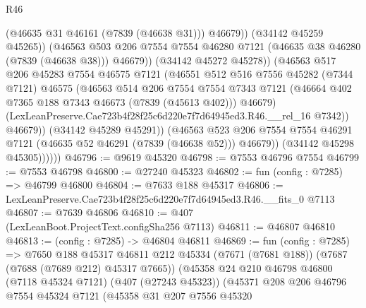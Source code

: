 \begin{lexlean}{R46}
\begin{coremodule}
                              (@46635 @31 @46161 (@7839 (@46638 @31)))
                              @46679))
                          (@34142 @45259 @45265))
                        (@46563
                          @503
                          @206
                          @7554
                          @7554
                          @46280
                          @7121
                          (@46635 @38 @46280 (@7839 (@46638 @38)))
                          @46679))
                      (@34142 @45272 @45278))
                    (@46563
                      @517
                      @206
                      @45283
                      @7554
                      @46575
                      @7121
                      (@46551
                        @512
                        @516
                        @7556
                        @45282
                        (@7344 @7121)
                        @46575
                        (@46563
                          @514
                          @206
                          @7554
                          @7554
                          @7343
                          @7121
                          (@46664 @402 @7365 @188 @7343 @46673 (@7839 (@45613 @402)))
                          @46679)
                        (LexLeanPreserve.Cae723b4f28f25c6d220e7f7d64945ed3.R46.__rel_16 @7342))
                      @46679))
                  (@34142 @45289 @45291))
                (@46563
                  @523
                  @206
                  @7554
                  @7554
                  @46291
                  @7121
                  (@46635 @52 @46291 (@7839 (@46638 @52)))
                  @46679))
              (@34142 @45298 @45305))))))
@46796 := @9619 @45320
@46798 := @7553 @46796 @7554
@46799 := @7553 @46798
@46800 := @27240 @45323
@46802 := fun (config : @7285) => @46799 @46800
@46804 := @7633 @188 @45317
@46806 := LexLeanPreserve.Cae723b4f28f25c6d220e7f7d64945ed3.R46.__fits_0 @7113
@46807 := @7639 @46806
@46810 := @407 (LexLeanBoot.ProjectText.configSha256 @7113)
@46811 := @46807 @46810
@46813 := (config : @7285) -> @46804 @46811
@46869 := fun (config : @7285) =>
  @7650
    @188
    @45317
    @46811
    @212
    @45334
    (@7671 (@7681 @188))
    (@7687 (@7688 (@7689 @212) @45317 @7665))
    (@45358
      @24
      @210
      @46798
      @46800
      (@7118 @45324 @7121)
      (@407 (@27243 @45323))
      (@45371
        @208
        @206
        @46796
        @7554
        @45324
        @7121
        (@45358
          @31
          @207
          @7556
          @45320

\end{coremodule}
\end{lexlean}
